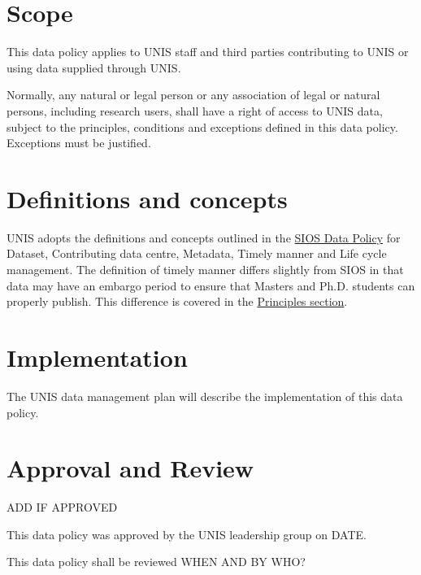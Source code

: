 \documentclass[a4paper,english, 11pt]{article}
\begin{document}
\section{Scope}
\label{s:scope}

This data policy applies to UNIS staff and third parties contributing to UNIS or using data supplied through UNIS.

Normally, any natural or legal person or any association of legal or natural persons, including
research users, shall have a right of access to UNIS data, subject to the
principles, conditions and exceptions defined in this data policy. Exceptions must be justified.

\section{Definitions and concepts}
\label{s:def}

UNIS adopts the definitions and concepts outlined in the \href{https://sios-svalbard.org/sites/sios-svalbard.org/files/common/SIOS_Data_Policy.pdf}{SIOS Data Policy} for Dataset, Contributing data centre, Metadata, Timely manner and Life cycle management. The definition of timely manner differs slightly from SIOS in that data may have an embargo period to ensure that Masters and Ph.D. students can properly publish. This difference is covered in the \hyperref[s:principles]{Principles section}.

\section{Implementation}
\label{s:implementation}

The UNIS data management plan will describe the implementation of this data policy.

\section{Approval and Review}
\label{s:approval}

ADD IF APPROVED

This data policy was approved by the UNIS leadership group on DATE. 

This data policy shall be reviewed WHEN AND BY WHO?
\end{document}
